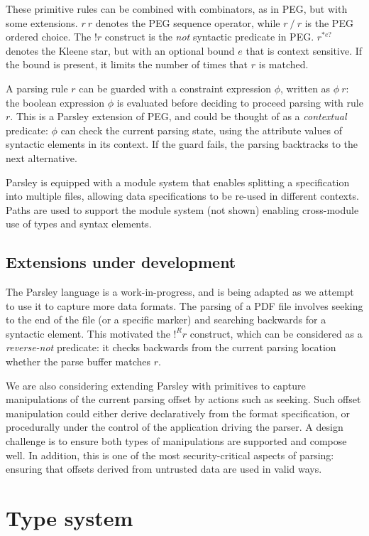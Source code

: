 \documentclass[letterpaper]{article}
\begin{document}
These primitive rules can be combined with combinators, as in PEG, but
with some extensions.  $r\ r$ denotes the PEG sequence operator, while
$r\ /\ r$ is the PEG ordered choice.  The $!r$ construct is the
\emph{not} syntactic predicate in PEG.  $r^{*e?}$ denotes the Kleene
star, but with an optional bound $e$ that is context sensitive.  If
the bound is present, it limits the number of times that $r$ is
matched.

A parsing rule $r$ can be guarded with a constraint expression $\phi$,
written as $\phi\ r$: the boolean expression $\phi$ is evaluated
before deciding to proceed parsing with rule $r$.  This is a Parsley
extension of PEG, and could be thought of as a \emph{contextual}
predicate: $\phi$ can check the current parsing state, using the
attribute values of syntactic elements in its context.  If the guard
fails, the parsing backtracks to the next alternative.

Parsley is equipped with a module system that enables splitting a
specification into multiple files, allowing data specifications to be
re-used in different contexts.  Paths are used to support the module
system (not shown) enabling cross-module use of types and syntax
elements.

\subsection*{Extensions under development}

The Parsley language is a work-in-progress, and is being adapted as we
attempt to use it to capture more data formats.  The parsing of a PDF
file involves seeking to the end of the file (or a specific marker)
and searching backwards for a syntactic element.  This motivated the
$!^Rr$ construct, which can be considered as a \emph{reverse-not}
predicate: it checks backwards from the current parsing location
whether the parse buffer matches $r$.

We are also considering extending Parsley with primitives to capture
manipulations of the current parsing offset by actions such as
seeking.  Such offset manipulation could either derive declaratively
from the format specification, or procedurally under the control of
the application driving the parser.  A design challenge is to ensure
both types of manipulations are supported and compose well.  In
addition, this is one of the most security-critical aspects of
parsing: ensuring that offsets derived from untrusted data are used in
valid ways.

\section{Type system}
\end{document}
